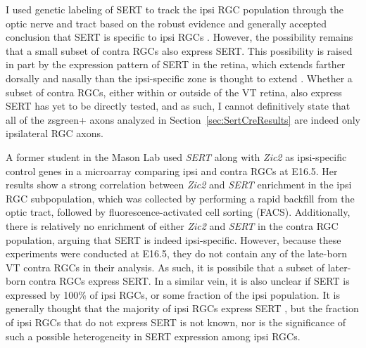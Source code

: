 \label{sec:TechnicalSERT}
I used genetic labeling of SERT to track the ipsi RGC population through the optic nerve and tract based on the robust evidence and generally accepted conclusion that SERT is specific to ipsi RGCs \cite{garcia2010zic2,koch2011pathway,upton1999excess}.
However, the possibility remains that a small subset of contra RGCs also express SERT.
This possibility is raised in part by the expression pattern of SERT in the retina, which extends farther dorsally and nasally than the ipsi-specific zone is thought to extend \cite{upton1999excess}.
Whether a subset of contra RGCs, either within or outside of the VT retina, also express SERT has yet to be directly tested, and as such, I cannot definitively state that all of the zsgreen+ axons analyzed in Section~\ref{sec:SertCreResults} are indeed only ipsilateral RGC axons.

A former student in the Mason Lab used \emph{SERT} along with \emph{Zic2} as ipsi-specific control genes in a microarray comparing ipsi and contra RGCs at E16.5. %
Her results show a strong correlation between \emph{Zic2} and \emph{SERT} enrichment in the ipsi RGC subpopulation, which was collected by performing a rapid backfill from the optic tract, followed by fluorescence-activated cell sorting (FACS). 
Additionally, there is relatively no enrichment of either \emph{Zic2} and \emph{SERT} in the contra RGC population, arguing that SERT is indeed ipsi-specific.
However, because these experiments were conducted at E16.5, they do not contain any of the late-born VT contra RGCs in their analysis.
As such, it is possibile that a subset of later-born contra RGCs express SERT.
In a similar vein, it is also unclear if SERT is expressed by 100\% of ipsi RGCs, or some fraction of the ipsi population.
It is generally thought that the majority of ipsi RGCs express SERT \cite{garcia2010zic2,koch2011pathway}, but the fraction of ipsi RGCs that do not express SERT is not known, nor is the significance of such a possible heterogeneity in SERT expression among ipsi RGCs.

